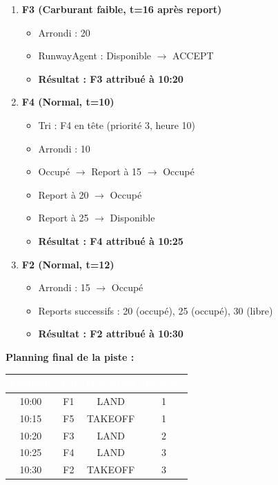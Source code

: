 \documentclass[12pt,a4paper]{article}
\begin{document}
\begin{enumerate}[leftmargin=*, label=\textcolor{primaryblue}{\textbf{Cycle \arabic*:}}]
    \item \textbf{F3 (Carburant faible, t=16 après report)}
    \begin{itemize}
        \item Arrondi : 20
        \item RunwayAgent : Disponible $\rightarrow$ ACCEPT
        \item \textbf{Résultat : F3 attribué à 10:20}
    \end{itemize}

    \item \textbf{F4 (Normal, t=10)}
    \begin{itemize}
        \item Tri : F4 en tête (priorité 3, heure 10)
        \item Arrondi : 10
        \item Occupé $\rightarrow$ Report à 15 $\rightarrow$ Occupé
        \item Report à 20 $\rightarrow$ Occupé
        \item Report à 25 $\rightarrow$ Disponible
        \item \textbf{Résultat : F4 attribué à 10:25}
    \end{itemize}

    \item \textbf{F2 (Normal, t=12)}
    \begin{itemize}
        \item Arrondi : 15 $\rightarrow$ Occupé
        \item Reports successifs : 20 (occupé), 25 (occupé), 30 (libre)
        \item \textbf{Résultat : F2 attribué à 10:30}
    \end{itemize}
\end{enumerate}

\textbf{Planning final de la piste :}

\begin{center}
\begin{tabular}{|c|c|c|c|}
\hline
\rowcolor{primaryblue!60}
\textcolor{white}{\textbf{Créneau}} & \textcolor{white}{\textbf{Vol}} & \textcolor{white}{\textbf{Opération}} & \textcolor{white}{\textbf{Priorité}} \\
\hline
\rowcolor{green!20}
10:00 & F1 & LAND & 1 \\
\hline
10:15 & F5 & TAKEOFF & 1 \\
\hline
\rowcolor{yellow!30}
10:20 & F3 & LAND & 2 \\
\hline
10:25 & F4 & LAND & 3 \\
\hline
10:30 & F2 & TAKEOFF & 3 \\
\hline
\end{tabular}
\end{center}
\end{document}
